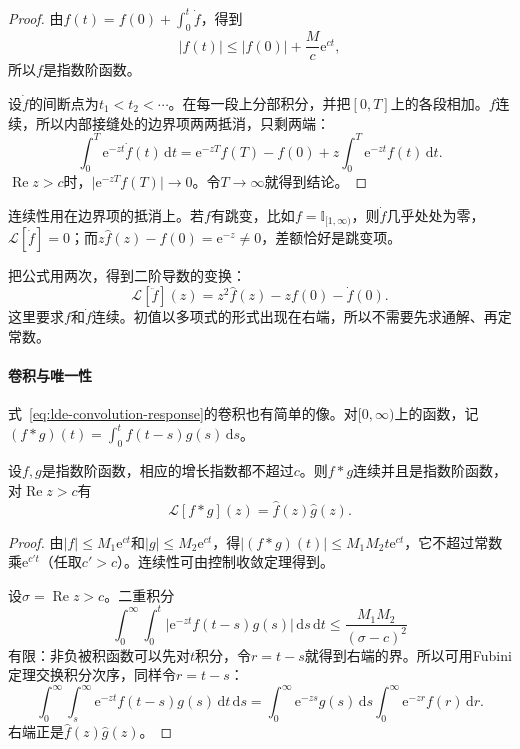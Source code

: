 \begin{proof}
由$f(t)=f(0)+\int_0^t\dot{f}$，得到
\[
 \lvert f(t)\rvert\leq\lvert f(0)\rvert+\frac{M}{c}\mathrm{e}^{ct},
\]
所以$f$是指数阶函数。

设$\dot{f}$的间断点为$t_1<t_2<\cdots$。在每一段上分部积分，并把$[0,T]$上的各段相加。$f$连续，所以内部接缝处的边界项两两抵消，只剩两端：
\[
 \int_0^T\mathrm{e}^{-zt}\dot{f}(t)\,\mathrm{d}t=\mathrm{e}^{-zT}f(T)-f(0)+z\int_0^T\mathrm{e}^{-zt}f(t)\,\mathrm{d}t.
\]
$\operatorname{Re}z>c$时，$\lvert\mathrm{e}^{-zT}f(T)\rvert\to0$。令$T\to\infty$就得到结论。
\end{proof}

连续性用在边界项的抵消上。若$f$有跳变，比如$f=\mathbb{I}_{[1,\infty)}$，则$\dot{f}$几乎处处为零，$\mathcal{L}[\dot{f}]=0$；而$z\hat{f}(z)-f(0)=\mathrm{e}^{-z}\neq0$，差额恰好是跳变项。

把公式用两次，得到二阶导数的变换：
\begin{equation}
 \mathcal{L}[\ddot{f}](z)=z^2\hat{f}(z)-zf(0)-\dot{f}(0).
 \label{eq:lde-laplace-second}
\end{equation}
这里要求$f$和$\dot{f}$连续。初值以多项式的形式出现在右端，所以不需要先求通解、再定常数。

\paragraph{卷积与唯一性}
式~\eqref{eq:lde-convolution-response}的卷积也有简单的像。对$[0,\infty)$上的函数，记$(f*g)(t)=\int_0^tf(t-s)g(s)\,\mathrm{d}s$。

\begin{theorem}[卷积定理]
\label{thm:lde-laplace-convolution}
设$f,g$是指数阶函数，相应的增长指数都不超过$c$。则$f*g$连续并且是指数阶函数，对$\operatorname{Re}z>c$有
\begin{equation}
 \mathcal{L}[f*g](z)=\hat{f}(z)\hat{g}(z).
 \label{eq:lde-laplace-convolution}
\end{equation}
\end{theorem}

\begin{proof}
由$\lvert f\rvert\leq M_1\mathrm{e}^{ct}$和$\lvert g\rvert\leq M_2\mathrm{e}^{ct}$，得$\lvert(f*g)(t)\rvert\leq M_1M_2t\mathrm{e}^{ct}$，它不超过常数乘$\mathrm{e}^{c't}$（任取$c'>c$）。连续性可由控制收敛定理得到。

设$\sigma=\operatorname{Re}z>c$。二重积分
\[
 \int_0^{\infty}\!\!\int_0^t\lvert\mathrm{e}^{-zt}f(t-s)g(s)\rvert\,\mathrm{d}s\,\mathrm{d}t\leq\frac{M_1M_2}{(\sigma-c)^2}
\]
有限：非负被积函数可以先对$t$积分，令$r=t-s$就得到右端的界。所以可用Fubini定理交换积分次序，同样令$r=t-s$：
\[
 \int_0^{\infty}\!\!\int_s^{\infty}\mathrm{e}^{-zt}f(t-s)g(s)\,\mathrm{d}t\,\mathrm{d}s=\int_0^{\infty}\mathrm{e}^{-zs}g(s)\,\mathrm{d}s\int_0^{\infty}\mathrm{e}^{-zr}f(r)\,\mathrm{d}r.
\]
右端正是$\hat{f}(z)\hat{g}(z)$。
\end{proof}

